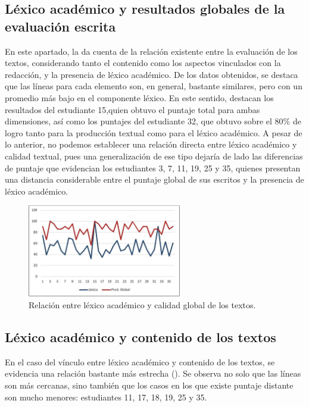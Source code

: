 \documentclass{textolivre}
\begin{document}
\subsection{Léxico académico y resultados globales de la evaluación escrita}\label{sec-lex-aca-res}
En este apartado, la  da cuenta de la relación existente entre la
evaluación de los textos, considerando tanto el contenido como los aspectos
vinculados con la redacción, y la presencia de léxico académico. De los datos
obtenidos, se destaca que las líneas para cada elemento son, en general,
bastante similares, pero con un promedio más bajo en el componente léxico. En
este sentido, destacan los resultados del estudiante 15,quien obtuvo el puntaje
total para ambas dimensiones, así como los puntajes del estudiante 32, que
obtuvo sobre el 80\% de logro tanto para la producción textual como para el
léxico académico. A pesar de lo anterior, no podemos establecer una
relación directa entre léxico académico y calidad textual, pues una
generalización de ese tipo dejaría de lado las diferencias de puntaje que
evidencian los estudiantes 3, 7, 11, 19, 25 y 35, quienes presentan una
distancia considerable entre el puntaje global de sus escritos y la presencia de
léxico académico.

\begin{figure}[htbp]
 \centering
 \includegraphics[width=0.6\textwidth]{figure02.png}
 \caption{Relación entre léxico académico y calidad global de los textos.}
 \label{fig02}
\end{figure}


\subsection{Léxico académico y contenido de los textos}\label{sec-contenido}
En el caso del vínculo entre léxico académico y contenido de los textos,
se evidencia una relación bastante más estrecha (). Se observa no solo
que las líneas son más cercanas, sino también que los casos en los que existe
puntaje distante son mucho menores: estudiantes 11, 17, 18, 19, 25 y 35.
\end{document}

